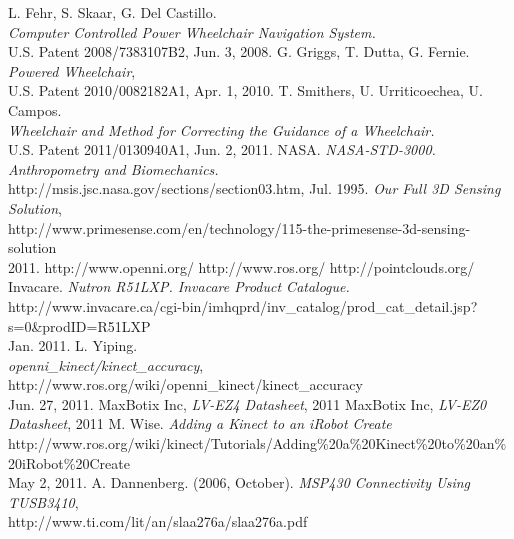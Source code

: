\documentclass[oneside,final,a4paper]{report}
\begin{document}
\begin{thebibliography}{9}
  L. Fehr, S. Skaar, G. Del Castillo. \\
  \emph{Computer Controlled Power Wheelchair Navigation System.} \\
  U.S. Patent 2008/7383107B2, Jun. 3, 2008.
  G. Griggs, T. Dutta, G. Fernie. \emph{Powered Wheelchair},\\
  U.S. Patent 2010/0082182A1, Apr. 1, 2010.
  T. Smithers, U. Urriticoechea, U. Campos. \\
  \emph{Wheelchair and Method for Correcting the Guidance of a Wheelchair.} \\
  U.S. Patent 2011/0130940A1, Jun. 2, 2011.
  NASA. \emph{NASA-STD-3000. Anthropometry and Biomechanics.}\\
  http://msis.jsc.nasa.gov/sections/section03.htm, Jul. 1995.
  \emph{Our Full 3D Sensing Solution}, \\
  \mbox{http://www.primesense.com/en/technology/115-the-primesense-3d-sensing-solution} \\
  2011.
  http://www.openni.org/
  http://www.ros.org/
  http://pointclouds.org/
  Invacare. \emph{Nutron R51LXP. Invacare Product Catalogue.} \\
  http://www.invacare.ca/cgi-bin/imhqprd/inv\_catalog/prod\_cat\_detail.jsp?s=0\&prodID=R51LXP\\
 Jan. 2011.
  L. Yiping. \\
  \emph{openni\_kinect/kinect\_accuracy}, http://www.ros.org/wiki/openni\_kinect/kinect\_accuracy\\
  Jun. 27, 2011.
  MaxBotix Inc, \emph{LV-EZ4 Datasheet},  2011
  MaxBotix Inc, \emph{LV-EZ0 Datasheet},  2011
  M. Wise.  \emph{Adding a Kinect to an iRobot Create} \\
  http://www.ros.org/wiki/kinect/Tutorials/Adding\%20a\%20Kinect\%20to\%20an\%20iRobot\%20Create\\
  May 2, 2011.
  A. Dannenberg. (2006, October). \emph{MSP430 Connectivity Using TUSB3410},\\
  http://www.ti.com/lit/an/slaa276a/slaa276a.pdf
\end{thebibliography}
\end{document}
